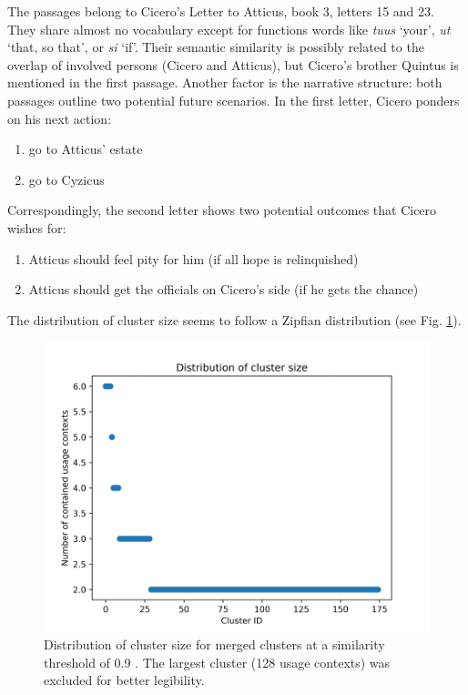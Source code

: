 \documentclass[oneside]{book}
\begin{document}
The passages belong to Cicero's Letter to Atticus, book 3, letters 15 and 23. They share almost no vocabulary except for functions words like \textit{tuus} `your', \textit{ut} `that, so that', or \textit{si} `if'. Their semantic similarity is possibly related to the overlap of involved persons (Cicero and Atticus), but Cicero's brother Quintus is mentioned in the first passage. Another factor is the narrative structure: both passages outline two potential future scenarios. In the first letter, Cicero ponders on his next action:
\begin{enumerate}[label=(\alph*)]
	\item go to Atticus' estate
	\item go to Cyzicus
\end{enumerate}
Correspondingly, the second letter shows two potential outcomes that Cicero wishes for:
\begin{enumerate}[label=(\alph*)]
	\item Atticus should feel pity for him (if all hope is relinquished)
	\item Atticus should get the officials on Cicero's side (if he gets the chance)
\end{enumerate}



The distribution of cluster size seems to follow a Zipfian distribution (see Fig. \ref{figure:cluster_size_distribution}). 

\begin{figure}[ht]
	\includegraphics[width=\linewidth]{cluster_size_distribution.pdf}
	\caption{Distribution of cluster size for merged clusters at a similarity threshold of 0.9 . The largest cluster (128 usage contexts) was excluded for better legibility.}
	\label{figure:cluster_size_distribution}
\end{figure}
\end{document}
